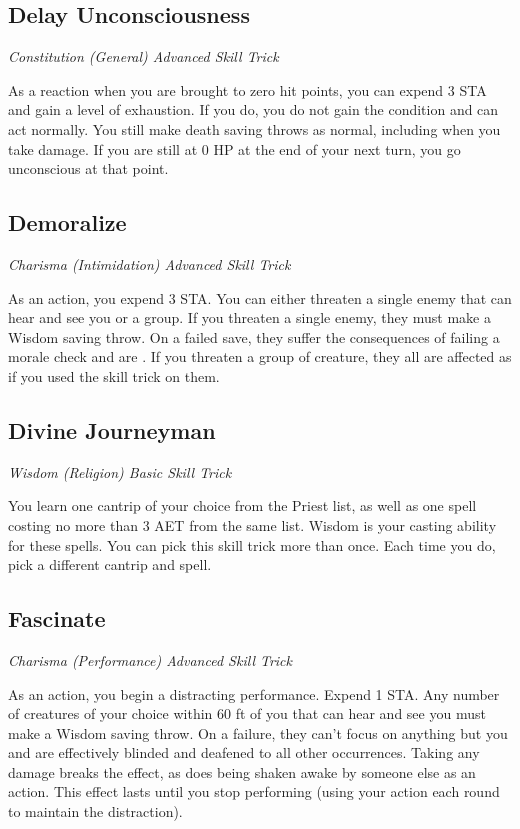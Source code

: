 \subsection{Delay Unconsciousness}

\textit{Constitution (General) Advanced Skill Trick}

As a reaction when you are brought to zero hit points, you can expend 3 STA and gain a level of exhaustion. If you do, you do not gain the  condition and can act normally. You still make death saving throws as normal, including when you take damage. If you are still at 0 HP at the end of your next turn, you go unconscious at that point.

\subsection{Demoralize}\label{st:demoralize}

\textit{Charisma (Intimidation) Advanced Skill Trick}

As an action, you expend 3 STA. You can either threaten a single enemy that can hear and see you or a group. If you threaten a single enemy, they must make a Wisdom saving throw. On a failed save, they suffer the consequences of failing a morale check and are . If you threaten a group of creature, they all are affected as if you used the  skill trick on them.

\subsection{Divine Journeyman}

\textit{Wisdom (Religion) Basic Skill Trick}

You learn one cantrip of your choice from the Priest list, as well as one spell costing no more than 3 AET from the same list. Wisdom is your casting ability for these spells. You can pick this skill trick more than once. Each time you do, pick a different cantrip and spell.

\subsection{Fascinate}

\textit{Charisma (Performance) Advanced Skill Trick}

As an action, you begin a distracting performance. Expend 1 STA. Any number of creatures of your choice within 60 ft of you that can hear and see you must make a Wisdom saving throw. On a failure, they can't focus on anything but you and are effectively blinded and deafened to all other occurrences. Taking any damage breaks the effect, as does being shaken awake by someone else as an action. This effect lasts until you stop performing (using your action each round to maintain the distraction).

